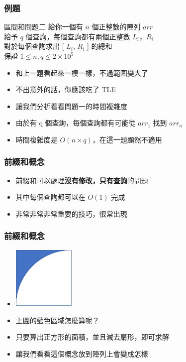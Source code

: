 \documentclass{beamer}
\begin{document}
\begin{frame}
    \frametitle{例題}
    \begin{block}{區間和問題二}
        給你一個有 $n$ 個正整數的陣列 $arr$\\
        給予 $q$ 個查詢，每個查詢都有兩個正整數 $L_i$，$R_i$\\
        對於每個查詢求出 [ $L_i$, $R_i$ ] 的總和\\

        保證 $1 \leq n, q \leq 2 \times 10^5$
    \end{block}
    \begin{itemize}
        \item<2-> 和上一題看起來一模一樣，不過範圍變大了
        \item<2-> 不出意外的話，你應該吃了 TLE
        \item<3-> 讓我們分析看看問題一的時間複雜度
        \item<3-> 由於有 q 個查詢，每個查詢都有可能從 $arr_1$ 找到 $arr_n$
        \item<3-> 時間複雜度是 $O(n \times q)$，在這一題顯然不適用
    \end{itemize}
\end{frame}

\begin{frame}
    \frametitle{前綴和概念}
    \begin{itemize}
        \item 前綴和可以處理\textbf{沒有修改，只有查詢}的問題
        \item 其中每個查詢都可以在 $O(1)$ 完成
        \item 非常非常非常重要的技巧，很常出現
    \end{itemize}
\end{frame}

\begin{frame}
    \frametitle{前綴和概念}
    \begin{itemize}
        \item \includegraphics[width=3.0cm]{img/img_6.png}
        \item 上圖的藍色區域怎麼算呢？
        \item<2-> 只要算出正方形的面積，並且減去扇形，即可求解
        \item<2-> 讓我們看看這個概念放到陣列上會變成怎樣
    \end{itemize}
\end{frame}
\end{document}
